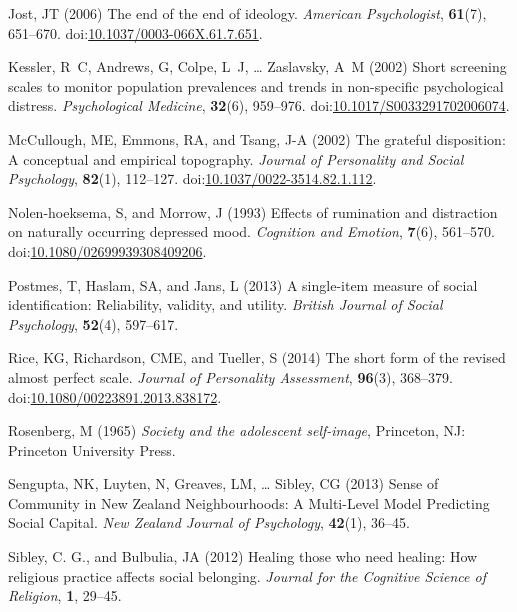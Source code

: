 \documentclass[
  single column]{article}
\newlength{\cslhangindent}
\newenvironment{CSLReferences}[2] %
 {\begin{list}{}{%
  \setlength{\itemindent}{0pt}
  \setlength{\leftmargin}{0pt}
  \setlength{\parsep}{0pt}
  \ifodd #1
   \setlength{\leftmargin}{\cslhangindent}
   \setlength{\itemindent}{-1\cslhangindent}
  \fi
  \setlength{\itemsep}{#2\baselineskip}}}
 {\end{list}}
\begin{document}
\begin{CSLReferences}{1}{0}
Jost, JT (2006) The end of the end of ideology. \emph{American
Psychologist}, \textbf{61}(7), 651--670.
doi:\href{https://doi.org/10.1037/0003-066X.61.7.651}{10.1037/0003-066X.61.7.651}.

Kessler, R~C, Andrews, G, Colpe, L~J, \ldots{} Zaslavsky, A~M (2002)
Short screening scales to monitor population prevalences and trends in
non-specific psychological distress. \emph{Psychological Medicine},
\textbf{32}(6), 959--976.
doi:\href{https://doi.org/10.1017/S0033291702006074}{10.1017/S0033291702006074}.

McCullough, ME, Emmons, RA, and Tsang, J-A (2002) The grateful
disposition: A conceptual and empirical topography. \emph{Journal of
Personality and Social Psychology}, \textbf{82}(1), 112--127.
doi:\href{https://doi.org/10.1037/0022-3514.82.1.112}{10.1037/0022-3514.82.1.112}.

Nolen-hoeksema, S, and Morrow, J (1993) Effects of rumination and
distraction on naturally occurring depressed mood. \emph{Cognition and
Emotion}, \textbf{7}(6), 561--570.
doi:\href{https://doi.org/10.1080/02699939308409206}{10.1080/02699939308409206}.

Postmes, T, Haslam, SA, and Jans, L (2013) A single-item measure of
social identification: Reliability, validity, and utility. \emph{British
Journal of Social Psychology}, \textbf{52}(4), 597--617.

Rice, KG, Richardson, CME, and Tueller, S (2014) The short form of the
revised almost perfect scale. \emph{Journal of Personality Assessment},
\textbf{96}(3), 368--379.
doi:\href{https://doi.org/10.1080/00223891.2013.838172}{10.1080/00223891.2013.838172}.

Rosenberg, M (1965) \emph{Society and the adolescent self-image},
Princeton, NJ: Princeton University Press.

Sengupta, NK, Luyten, N, Greaves, LM, \ldots{} Sibley, CG (2013) Sense
of Community in {N}ew {Z}ealand Neighbourhoods: A Multi-Level Model
Predicting Social Capital. \emph{New Zealand Journal of Psychology},
\textbf{42}(1), 36--45.

Sibley, C. G., and Bulbulia, JA (2012) Healing those who need healing:
How religious practice affects social belonging. \emph{Journal for the
Cognitive Science of Religion}, \textbf{1}, 29--45.


\end{CSLReferences}
\end{document}
